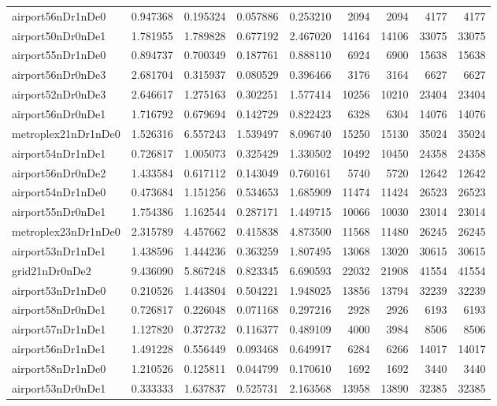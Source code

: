 \begin{longtable}{|l|r|r|r|r|r|r|r|r|}
airport56nDr1nDe0 & 0.947368 & 0.195324 & 0.057886 & 0.253210 & 2094 & 2094 & 4177 & 4177 \\
airport50nDr0nDe1 & 1.781955 & 1.789828 & 0.677192 & 2.467020 & 14164 & 14106 & 33075 & 33075 \\
airport55nDr1nDe0 & 0.894737 & 0.700349 & 0.187761 & 0.888110 & 6924 & 6900 & 15638 & 15638 \\
airport56nDr0nDe3 & 2.681704 & 0.315937 & 0.080529 & 0.396466 & 3176 & 3164 & 6627 & 6627 \\
airport52nDr0nDe3 & 2.646617 & 1.275163 & 0.302251 & 1.577414 & 10256 & 10210 & 23404 & 23404 \\
airport56nDr0nDe1 & 1.716792 & 0.679694 & 0.142729 & 0.822423 & 6328 & 6304 & 14076 & 14076 \\
metroplex21nDr1nDe0 & 1.526316 & 6.557243 & 1.539497 & 8.096740 & 15250 & 15130 & 35024 & 35024 \\
airport54nDr1nDe1 & 0.726817 & 1.005073 & 0.325429 & 1.330502 & 10492 & 10450 & 24358 & 24358 \\
airport56nDr0nDe2 & 1.433584 & 0.617112 & 0.143049 & 0.760161 & 5740 & 5720 & 12642 & 12642 \\
airport54nDr1nDe0 & 0.473684 & 1.151256 & 0.534653 & 1.685909 & 11474 & 11424 & 26523 & 26523 \\
airport55nDr0nDe1 & 1.754386 & 1.162544 & 0.287171 & 1.449715 & 10066 & 10030 & 23014 & 23014 \\
metroplex23nDr1nDe0 & 2.315789 & 4.457662 & 0.415838 & 4.873500 & 11568 & 11480 & 26245 & 26245 \\
airport53nDr1nDe1 & 1.438596 & 1.444236 & 0.363259 & 1.807495 & 13068 & 13020 & 30615 & 30615 \\
grid21nDr0nDe2 & 9.436090 & 5.867248 & 0.823345 & 6.690593 & 22032 & 21908 & 41554 & 41554 \\
airport53nDr1nDe0 & 0.210526 & 1.443804 & 0.504221 & 1.948025 & 13856 & 13794 & 32239 & 32239 \\
airport58nDr0nDe1 & 0.726817 & 0.226048 & 0.071168 & 0.297216 & 2928 & 2926 & 6193 & 6193 \\
airport57nDr1nDe1 & 1.127820 & 0.372732 & 0.116377 & 0.489109 & 4000 & 3984 & 8506 & 8506 \\
airport56nDr1nDe1 & 1.491228 & 0.556449 & 0.093468 & 0.649917 & 6284 & 6266 & 14017 & 14017 \\
airport58nDr1nDe0 & 1.210526 & 0.125811 & 0.044799 & 0.170610 & 1692 & 1692 & 3440 & 3440 \\
airport53nDr0nDe1 & 0.333333 & 1.637837 & 0.525731 & 2.163568 & 13958 & 13890 & 32385 & 32385 \\

\end{longtable}
